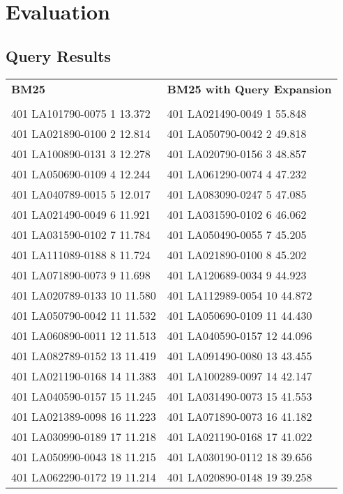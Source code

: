 
\section{Evaluation}
\label{sec:evaluation}

\setlength{\tabcolsep}{15pt}

\subsection*{Query Results}

\begin{tabular}{ l l }
\textbf{BM25} & \textbf{BM25 with Query Expansion}\\
\\
401 LA101790-0075 1 13.372 & 401 LA021490-0049 1 55.848\\
401 LA021890-0100 2 12.814 & 401 LA050790-0042 2 49.818\\
401 LA100890-0131 3 12.278 & 401 LA020790-0156 3 48.857\\
401 LA050690-0109 4 12.244 & 401 LA061290-0074 4 47.232\\
401 LA040789-0015 5 12.017 & 401 LA083090-0247 5 47.085\\
401 LA021490-0049 6 11.921 & 401 LA031590-0102 6 46.062\\
401 LA031590-0102 7 11.784 & 401 LA050490-0055 7 45.205\\
401 LA111089-0188 8 11.724 & 401 LA021890-0100 8 45.202\\
401 LA071890-0073 9 11.698 & 401 LA120689-0034 9 44.923\\
401 LA020789-0133 10 11.580 & 401 LA112989-0054 10 44.872\\
401 LA050790-0042 11 11.532 & 401 LA050690-0109 11 44.430\\
401 LA060890-0011 12 11.513 & 401 LA040590-0157 12 44.096\\
401 LA082789-0152 13 11.419 & 401 LA091490-0080 13 43.455\\
401 LA021190-0168 14 11.383 & 401 LA100289-0097 14 42.147\\
401 LA040590-0157 15 11.245 & 401 LA031490-0073 15 41.553\\
401 LA021389-0098 16 11.223 & 401 LA071890-0073 16 41.182\\
401 LA030990-0189 17 11.218 & 401 LA021190-0168 17 41.022\\
401 LA050990-0043 18 11.215 & 401 LA030190-0112 18 39.656\\
401 LA062290-0172 19 11.214 & 401 LA020890-0148 19 39.258\\

\end{tabular}
